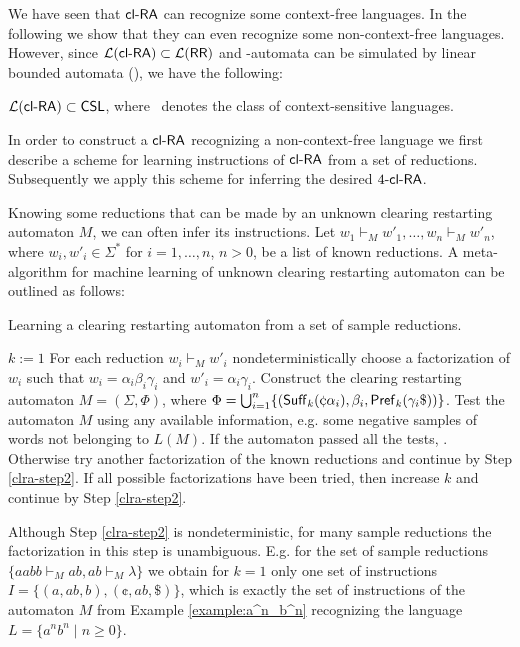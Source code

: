 We have seen that $\clRA$ can recognize some context-free languages. In the following we show that they can even recognize some non-context-free languages. However, since $\calL{\clRA} \subset \calL{\RR}$ and \RR-automata can be simulated by linear bounded automata (\cite{JMPV99}), we have the following:

\begin{corollary}
$\calL{\clRA} \subset \CSL$, where \CSL\ denotes the class of context-sensitive languages.
\end{corollary}

In order to construct a $\clRA$ recognizing a non-context-free language we first describe a scheme for learning instructions of $\clRA$ from a set of reductions. Subsequently we apply this scheme for inferring the desired $\kclRA[4]$.

Knowing some reductions that can be made by an unknown clearing restarting automaton $M$, we can often infer its instructions. Let $w_1 \vdash_M w'_1, \dots, w_n \vdash_M w'_n$, where $w_i,w'_i \in \Sigma^*$ for $i=1, \dots, n$, $n>0$, be a list of known reductions. A meta-algorithm for machine learning of unknown clearing restarting automaton can be outlined as follows:

\begin{algorithm}
\caption{Learning a clearing restarting automaton from a set of sample reductions.}
\label{algorithm:clra-learning}
\DontPrintSemicolon
\LinesNumbered
{}
$k := 1$\;
For each reduction $w_i \vdash_M w'_i$ nondeterministically choose a factorization of $w_i$ such that $w_i = \alpha_i \beta_i \gamma_i$ and $w'_i = \alpha_i \gamma_i$.\;\label{clra-step2}
Construct the clearing restarting automaton $M = (\Sigma, \Phi)$, where $\Phi = \bigcup_{i=1}^n \{(\Suff_k(\cent\alpha_i),\beta_i,\Pref_k(\gamma_i\$))\}$.\;
Test the automaton $M$ using any available information, e.g. some negative samples of words not belonging to $L(M)$.\;
If the automaton passed all the tests, . \;
Otherwise try another factorization of the known reductions and continue by Step \ref{clra-step2}. If all possible factorizations have been tried, then increase $k$ and continue by Step \ref{clra-step2}.\;
\end{algorithm}

Although Step \ref{clra-step2} is nondeterministic, for many sample reductions the factorization in this step is unambiguous. E.g. for the set of sample reductions $\{aabb \vdash_M ab, ab \vdash_M \lambda\}$ we obtain for $k=1$ only one set of instructions $I=\{(a,ab,b),(\cent,ab,\$)\}$, which is exactly the set of instructions of the automaton $M$ from Example \ref{example:a^n_b^n} recognizing the language $L = \{a^nb^n \mid n\ge 0\}$.

